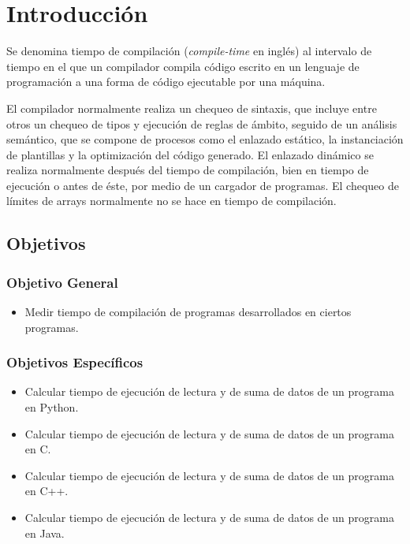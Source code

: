 \section{Introducción}

Se denomina tiempo de compilación (\textit{compile-time} en inglés) al intervalo de tiempo en el que un compilador compila código escrito en un lenguaje de programación a una forma de código ejecutable por una máquina.

El compilador normalmente realiza un chequeo de sintaxis, que incluye entre otros un chequeo de tipos y ejecución de reglas de ámbito, seguido de un análisis semántico, que se compone de procesos como el enlazado estático, la instanciación de plantillas y la optimización del código generado. El enlazado dinámico se realiza normalmente después del tiempo de compilación, bien en tiempo de ejecución o antes de éste, por medio de un cargador de programas. El chequeo de límites de arrays normalmente no se hace en tiempo de compilación. \cite{R1}
\subsection{Objetivos}



\subsubsection{Objetivo General}
\begin{itemize}
\item Medir tiempo de compilación de programas desarrollados en ciertos programas.
\end{itemize}

\subsubsection{Objetivos Específicos}
\begin{itemize}
\item Calcular tiempo de ejecución de lectura y de suma de datos de un programa en Python.
\item Calcular tiempo de ejecución de lectura y de suma de datos de un programa en C.
\item Calcular tiempo de ejecución de lectura y de suma de datos de un programa en C++.
\item Calcular tiempo de ejecución de lectura y de suma de datos de un programa en Java.
\end{itemize}

